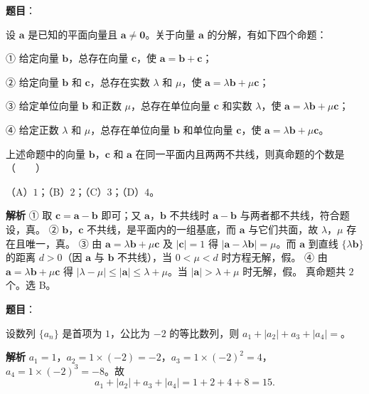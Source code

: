 \begin{answer}

\textbf{题目}：

设 $\boldsymbol a$ 是已知的平面向量且 $\boldsymbol a\neq\boldsymbol 0$。关于向量 $\boldsymbol a$ 的分解，有如下四个命题：

① 给定向量 $\boldsymbol b$，总存在向量 $\boldsymbol c$，使 $\boldsymbol a=\boldsymbol b+\boldsymbol c$；

② 给定向量 $\boldsymbol b$ 和 $\boldsymbol c$，总存在实数 $\lambda$ 和 $\mu$，使 $\boldsymbol a=\lambda\boldsymbol b+\mu\boldsymbol c$；

③ 给定单位向量 $\boldsymbol b$ 和正数 $\mu$，总存在单位向量 $\boldsymbol c$ 和实数 $\lambda$，使 $\boldsymbol a=\lambda\boldsymbol b+\mu\boldsymbol c$；

④ 给定正数 $\lambda$ 和 $\mu$，总存在单位向量 $\boldsymbol b$ 和单位向量 $\boldsymbol c$，使 $\boldsymbol a=\lambda\boldsymbol b+\mu\boldsymbol c$。

上述命题中的向量 $\boldsymbol b$，$\boldsymbol c$ 和 $\boldsymbol a$ 在同一平面内且两两不共线，则真命题的个数是\mbox{（　　）}

（A）$1$；（B）$2$；（C）$3$；（D）$4$。

\textbf{解析}
① 取 $\boldsymbol c=\boldsymbol a-\boldsymbol b$ 即可；又 $\boldsymbol a$，$\boldsymbol b$ 不共线时 $\boldsymbol a-\boldsymbol b$ 与两者都不共线，符合题设，真。
② $\boldsymbol b$，$\boldsymbol c$ 不共线，是平面内的一组基底，而 $\boldsymbol a$ 与它们共面，故 $\lambda$，$\mu$ 存在且唯一，真。
③ 由 $\boldsymbol a=\lambda\boldsymbol b+\mu\boldsymbol c$ 及 $|\boldsymbol c|=1$ 得 $|\boldsymbol a-\lambda\boldsymbol b|=\mu$。而 $\boldsymbol a$ 到直线 $\{\lambda\boldsymbol b\}$ 的距离 $d>0$（因 $\boldsymbol a$ 与 $\boldsymbol b$ 不共线），当 $0<\mu<d$ 时方程无解，假。
④ 由 $\boldsymbol a=\lambda\boldsymbol b+\mu\boldsymbol c$ 得 $|\lambda-\mu|\leqslant|\boldsymbol a|\leqslant\lambda+\mu$。当 $|\boldsymbol a|>\lambda+\mu$ 时无解，假。
真命题共 $2$ 个。选 B。


\end{answer}
\begin{answer}

\textbf{题目}：

设数列 $\{a_n\}$ 是首项为 $1$，公比为 $-2$ 的等比数列，则 $a_1+|a_2|+a_3+|a_4|=$\gkblank{}。

\textbf{解析}
$a_1=1$，$a_2=1\times(-2)=-2$，$a_3=1\times(-2)^2=4$，$a_4=1\times(-2)^3=-8$。故
\nopagebreak[4]
\[a_1+|a_2|+a_3+|a_4|=1+2+4+8=15.\]


\end{answer}
